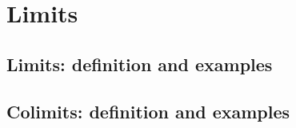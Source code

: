 \chapter{Limits}



\section{Limits: definition and examples}
\addtocounter{subsection}{32}













\section{Colimits: definition and examples}
\addtocounter{subsection}{20}



